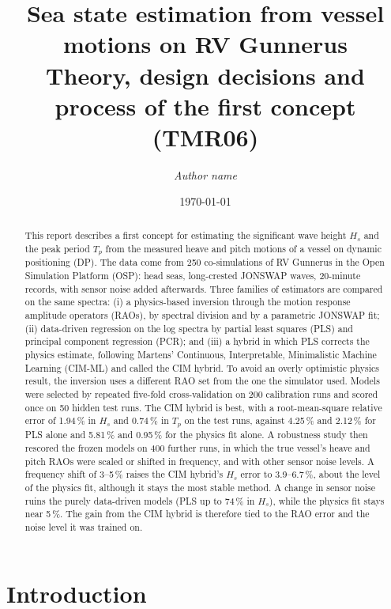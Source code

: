 \documentclass[11pt,a4paper]{article}
\title{Sea state estimation from vessel motions on RV Gunnerus\\[2pt]
       \large Theory, design decisions and process of the first concept (TMR06)}
\author{\textit{Author name}}
\date{\today}
\newcommand{\Hs}{H_{s}}
\newcommand{\Tp}{T_{p}}
\newcommand{\pct}[1]{#1\,\%}
\begin{document}
\maketitle

\begin{abstract}
\noindent
This report describes a first concept for estimating the significant wave height $\Hs$ and
the peak period $\Tp$ from the measured heave and pitch motions of a vessel on dynamic
positioning (DP). The data come from 250 co-simulations of RV Gunnerus in the Open Simulation
Platform (OSP): head seas, long-crested JONSWAP waves, 20-minute records, with sensor noise
added afterwards. Three families of estimators are compared on the same spectra: (i) a
physics-based inversion through the motion response amplitude operators (RAOs), by spectral
division and by a parametric JONSWAP fit; (ii) data-driven regression on the log spectra by
partial least squares (PLS) and principal component regression (PCR); and (iii) a hybrid in
which PLS corrects the physics estimate, following Martens' Continuous, Interpretable,
Minimalistic Machine Learning (CIM-ML) and called the CIM hybrid. To avoid an overly optimistic physics result, the
inversion uses a different RAO set from the one the simulator used. Models were selected by
repeated five-fold cross-validation on 200 calibration runs and scored once on 50 hidden test
runs. The CIM hybrid is best, with a root-mean-square relative error of
\pct{1.94} in $\Hs$ and \pct{0.74} in $\Tp$ on the test runs, against \pct{4.25} and
\pct{2.12} for PLS alone and \pct{5.81} and \pct{0.95} for the physics fit alone. A robustness
study then rescored the frozen models on 400 further runs, in which the true vessel's heave and
pitch RAOs were scaled or shifted in frequency, and with other sensor noise levels. A frequency
shift of 3--5\,\% raises the CIM hybrid's $\Hs$ error to 3.9--6.7\,\%, about the level of the physics
fit, although it stays the most stable method. A change in sensor noise ruins the purely
data-driven models (PLS up to \pct{74} in $\Hs$), while the physics fit stays near \pct{5}. The
gain from the CIM hybrid is therefore tied to the RAO error and the noise level it was trained on.
\end{abstract}

\tableofcontents
\clearpage

\section{Introduction}
\label{sec:intro}
\end{document}
